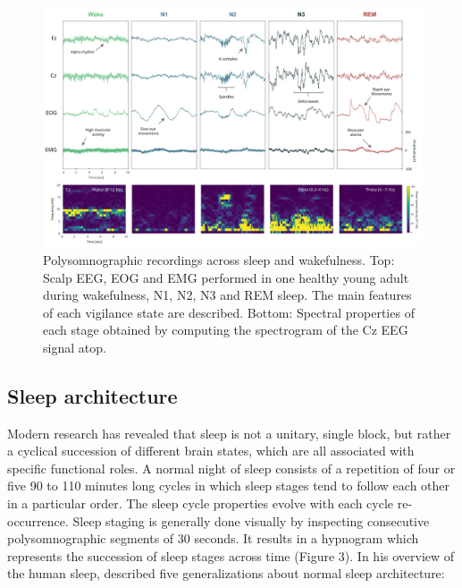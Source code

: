 \begin{figure}
	\centering
	\includegraphics[width=\linewidth, height=0.8\textheight, keepaspectratio]{Fig/Intro/Intro_Sleep_Stages_PSD/Intro_Sleep_Stages_PSD.png}
	\captionsetup{width=0.9\textheight}
	\caption[Polysomnographic recordings across sleep and wakefulness]{Polysomnographic recordings across sleep and wakefulness. Top: Scalp EEG, EOG and EMG performed in one healthy young adult during wakefulness, N1, N2, N3 and REM sleep. The main features of each vigilance state are described. Bottom: Spectral properties of each stage obtained by computing the spectrogram of the Cz EEG signal atop.}
	\label{fig:intro:sleep_stage}
\end{figure}

\subsection{Sleep architecture}
\label{sec:dream-research:sleep:architecture}

Modern research has revealed that sleep is not a unitary, single block, but rather a cyclical succession of different brain states, which are all associated with specific functional roles. A normal night of sleep consists of a repetition of four or five 90 to 110 minutes long cycles in which sleep stages tend to follow each other in a particular order. The sleep cycle properties evolve with each cycle re-occurrence. Sleep staging is generally done visually by inspecting consecutive polysomnographic segments of 30 seconds. It results in a hypnogram which represents the succession of sleep stages across time (Figure 3). In his overview of the human sleep, \citet{hirshkowitz_normal_2004} described five generalizations about normal sleep architecture:

